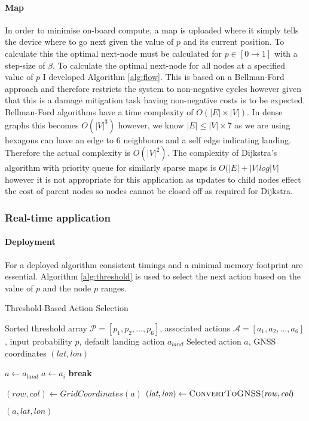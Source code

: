 \paragraph{Map}
In order to minimise on-board compute, a map is uploaded where it simply tells the device where to go next given the value of $p$ and its current position. To calculate this the optimal next-node must be calculated for $p\in[0\to1]$ with a step-size of $\beta$.  To calculate the optimal next-node for all nodes at a specified value of $p$ I developed Algorithm \ref{alg:flow}. This is based on a Bellman-Ford approach and therefore restricts the system to non-negative cycles however given that this is a damage mitigation task having non-negative costs is to be expected.  Bellman-Ford algorithms have a time complexity of $O(|E|\times |V|)$. In dense graphs this becomes  $O(|V|^3)$ however, we know $|E| \leq |V| \times 7$ as we are using hexagons can have an edge to 6 neighbours and a self edge indicating landing. Therefore the actual complexity is $O(|V|^2)$\cite{cormen2009}. The complexity of Dijkstra's algorithm with priority queue for similarly sparse maps is $O(|E| + |V|log|V|$ however it is not appropriate for this application as updates to child nodes effect the cost of parent nodes so nodes cannot be closed off as required for Dijkstra.

\subsubsection{Real-time application}\label{sub_sub_section:tgt_real_time}
\paragraph{Deployment}
For a deployed algorithm consistent timings and a minimal memory footprint are essential. Algorithm \ref{alg:threshold} is used to select the next action based on the value of $p$ and the node $p$ ranges.
\begin{algorithm}[htbp]
  \caption{Threshold-Based Action Selection}
  \label{alg:threshold}
  \begin{algorithmic}[1]
    \Require Sorted threshold array \(\mathcal{P} = [p_1, p_2, \dots, p_6]\), associated actions \(\mathcal{A} = [a_1, a_2, \dots, a_6]\), input probability \(p\), default landing action \(a_{\textit{land}}\)
    \Ensure Selected action \(a\), GNSS coordinates \((\textit{lat}, \textit{lon})\)
    
    \State \(a \gets a_{\textit{land}}\) 
        \State \(a \gets a_i\)
        \State \textbf{break}
      \EndIf
    \EndFor
    
    \State \((\textit{row}, \textit{col}) \gets \textit{GridCoordinates}(a)\)
    \State \((\textit{lat}, \textit{lon}) \gets \Call{ConvertToGNSS}{\textit{row}, \textit{col}}\)
    
    \State \Return \((a, \textit{lat}, \textit{lon})\)
  \end{algorithmic}
\end{algorithm}
